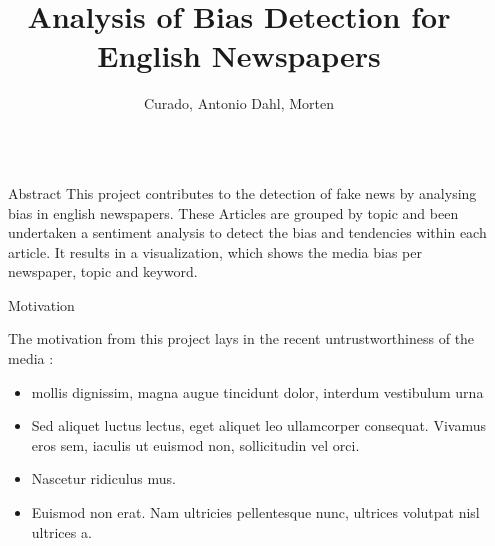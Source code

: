 \documentclass[final]{beamer}
\title{Analysis of Bias Detection for English Newspapers {\emoji[ios]{1F4F0}}} %
\author{Curado, Antonio  {\emoji[ios]{1F9E0}}  Dahl, Morten} %
\institute{Masters in Advanced Analytics @ Nova IMS} %
\newlength{\sepwid}
\newlength{\onecolwid}
\begin{document}

\setlength{\belowcaptionskip}{2ex} %
\setlength\belowdisplayshortskip{2ex} %

\begin{frame}[t] %

\begin{columns}[t] %

\begin{column}{\sepwid}\end{column} %

\begin{column}{\onecolwid} %



\begin{block}{Abstract}
This project contributes to the detection of fake news by analysing bias in english newspapers. These Articles are grouped by topic and been undertaken a sentiment analysis to detect the bias and tendencies within each article. It results in a visualization, which shows the media bias per newspaper, topic and keyword.

\end{block}



\begin{block}{Motivation {}}

    The motivation from this project lays in the recent untrustworthiness of the media :
    \begin{itemize}
    \item mollis dignissim, magna augue tincidunt dolor, interdum vestibulum urna
    \item Sed aliquet luctus lectus, eget aliquet leo ullamcorper consequat. Vivamus eros sem, iaculis ut euismod non, sollicitudin vel orci.
    \item Nascetur ridiculus mus.  
    \item Euismod non erat. Nam ultricies pellentesque nunc, ultrices volutpat nisl ultrices a.
    \end{itemize}


\end{block}
\end{column}
\end{columns}
\end{frame}
\end{document}
